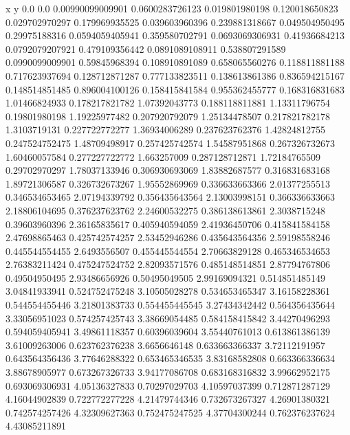               x                y
            0.0              0.0
0.00990099009901  0.0600283726123
 0.019801980198   0.120018650823
 0.029702970297   0.179969935525
 0.039603960396   0.239881318667
 0.049504950495    0.29975188316
0.0594059405941   0.359580702791
0.0693069306931    0.41936684213
0.0792079207921   0.479109356442
0.0891089108911   0.538807291589
0.0990099009901    0.59845968394
 0.108910891089   0.658065560276
 0.118811881188   0.717623937694
 0.128712871287   0.777133823511
 0.138613861386   0.836594215167
 0.148514851485   0.896004100126
 0.158415841584   0.955362455777
 0.168316831683    1.01466824933
 0.178217821782    1.07392043773
 0.188118811881    1.13311796754
  0.19801980198    1.19225977482
 0.207920792079    1.25134478507
 0.217821782178     1.3103719131
 0.227722772277    1.36934006289
 0.237623762376    1.42824812755
 0.247524752475    1.48709498917
 0.257425742574    1.54587951868
 0.267326732673    1.60460057584
 0.277227722772      1.663257009
 0.287128712871    1.72184765509
  0.29702970297    1.78037133946
 0.306930693069    1.83882687577
 0.316831683168    1.89721306587
 0.326732673267    1.95552869969
 0.336633663366    2.01377255513
 0.346534653465    2.07194339792
 0.356435643564    2.13003998151
 0.366336633663    2.18806104695
 0.376237623762    2.24600532275
 0.386138613861     2.3038715248
  0.39603960396    2.36165835617
 0.405940594059    2.41936450706
 0.415841584158    2.47698865463
 0.425742574257    2.53452946286
 0.435643564356    2.59198558246
 0.445544554455     2.6493556507
 0.455445544554    2.70663829128
 0.465346534653    2.76383211424
 0.475247524752    2.82093571576
 0.485148514851    2.87794767806
  0.49504950495    2.93486656926
  0.50495049505    2.99169094321
 0.514851485149    3.04841933941
 0.524752475248    3.10505028278
 0.534653465347    3.16158228361
 0.544554455446    3.21801383733
 0.554455445545    3.27434342442
 0.564356435644    3.33056951023
 0.574257425743    3.38669054485
 0.584158415842    3.44270496293
 0.594059405941    3.49861118357
  0.60396039604    3.55440761013
 0.613861386139    3.61009263006
 0.623762376238     3.6656646148
 0.633663366337    3.72112191957
 0.643564356436    3.77646288322
 0.653465346535    3.83168582808
 0.663366336634    3.88678905977
 0.673267326733    3.94177086708
 0.683168316832    3.99662952175
 0.693069306931    4.05136327833
  0.70297029703    4.10597037399
 0.712871287129    4.16044902839
 0.722772277228    4.21479744346
 0.732673267327    4.26901380321
 0.742574257426    4.32309627363
 0.752475247525    4.37704300244
 0.762376237624    4.43085211891
